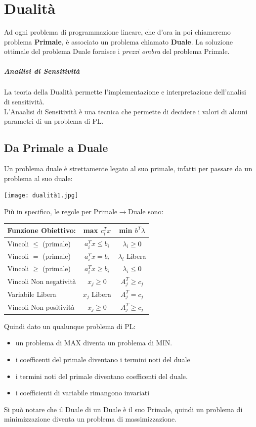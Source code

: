 \documentclass[12pt, a4paper, openany]{book}
\begin{document}
\chapter{Dualità}
Ad ogni problema di programmazione lineare, che d'ora in poi chiameremo problema \textbf{Primale},
è associato un problema chiamato \textbf{Duale}.
La soluzione ottimale del problema Duale fornisce i \emph{prezzi ombra} del problema Primale.

\paragraph{Anailisi di Sensitività} La teoria della Dualità permette l'implementazione e interpretazione dell'analisi di sensitività.
\\L'Anaalisi di Sensitività è una tecnica che permette di decidere i valori di alcuni parametri di un problema di PL.

\section{Da Primale a Duale}
Un problema duale è strettamente legato al suo primale, infatti per passare da un problema al suo duale:

\begin{center}
\texttt{[image: dualità1.jpg]}
\end{center}

Più in specifico, le regole per Primale$\to$Duale sono:

\begin{center}
    \begin{tabular}{ |l|c|c| }
        \hline
        Funzione Obiettivo:      & max $c_i^Tx$      & min $b^T\lambda$   \\
        \hline \hline
        Vincoli $\leq$ (primale) & $a_i^Tx \leq b_i$ & $\lambda_i \geq 0$ \\
        Vincoli $=$ (primale)    & $a_i^Tx = b_i$    & $\lambda_i$ Libera \\
        Vincoli $\geq$ (primale) & $a_i^Tx \geq b_i$ & $\lambda_i \leq 0$ \\
        \hline
        Vincoli Non negatività   & $x_j\geq 0$       & $A_j^T \geq c_j$   \\
        Variabile Libera         & $x_j$ Libera      & $A_j^T = c_j$      \\
        Vincoli Non positività   & $x_j\geq 0$       & $A_j^T \geq c_j$   \\
        \hline
    \end{tabular}
\end{center}
Quindi dato un qualunque problema di PL:
\begin{itemize}
    \item un problema di MAX diventa un problema di MIN.
    \item i coefficenti del primale diventano i termini noti del duale
    \item i termini noti del primale diventano coefficenti del duale.
    \item i coefficienti di variabile rimangono invariati
\end{itemize}
Si può notare che il Duale di un Duale è il suo Primale, quindi un problema di minimizzazione diventa un problema di massimizzazione.
\end{document}
